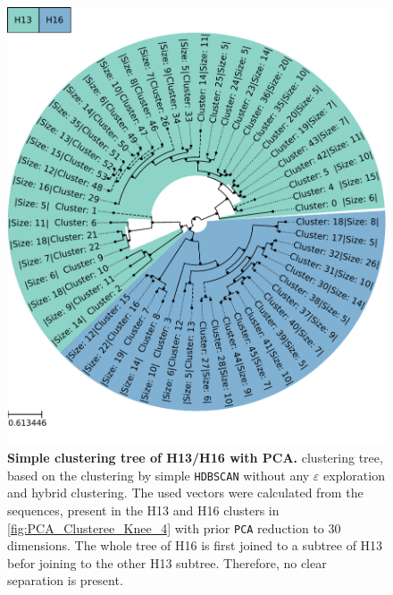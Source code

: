 \begin{figure}[!hbt]
    \centering
    \includegraphics[width=\textwidth]{PCA/Clustertree_Segment_4_H_Simple.pdf}
    \caption[Simple clustering tree of H13/H16 with PCA]{\textbf{Simple clustering tree of H13/H16 with PCA.} clustering tree, based on the clustering by simple \texttt{HDBSCAN} without any $\varepsilon$ exploration and hybrid clustering. The used vectors were calculated from the sequences, present in the H13 and H16 clusters in \autoref{fig:PCA_Clusteree_Knee_4} with prior \texttt{PCA} reduction to 30 dimensions. The whole tree of H16 is first joined to a subtree of H13 befor joining to the other H13 subtree. Therefore, no clear separation is present.}
    \label{fig:Simple_Clustertree_PCA}
\end{figure}

\vspace{1em}

